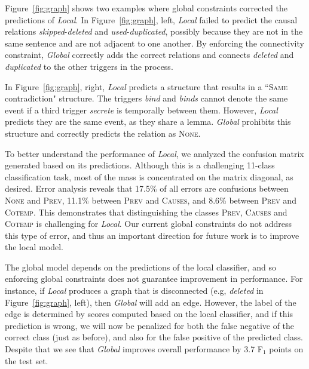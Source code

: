 Figure~\ref{fig:graph} shows two examples where global constraints corrected the predictions of \emph{Local}. In Figure~\ref{fig:graph}, left, \emph{Local} failed to predict the causal relations \emph{skipped}-\emph{deleted} and \emph{used}-\emph{duplicated}, possibly because they are not in the same sentence and are not adjacent to one another. By enforcing the connectivity constraint, \emph{Global} correctly adds the correct relations and connects \emph{deleted} and \emph{duplicated} to the other triggers in the process.

In Figure~\ref{fig:graph}, right, \emph{Local} predicts a structure that results in a ``\textsc{Same} contradiction" structure. The triggers \emph{bind} and \emph{binds} cannot denote the same event if a third trigger \emph{secrete} is temporally between them. However, \emph{Local} predicts they are the same event, as they share a lemma. \emph{Global} prohibits this structure and correctly predicts the relation as \textsc{None}.

To better understand the performance of \emph{Local}, we analyzed the confusion matrix generated based on its predictions. Although this is a challenging 11-class classification task, most of the mass is concentrated on the matrix diagonal, as desired. Error analysis reveals that 17.5\% of all errors are confusions between \textsc{None} and \textsc{Prev}, 11.1\% between \textsc{Prev} and \textsc{Causes}, and 8.6\% between \textsc{Prev} and \textsc{Cotemp}. This demonstrates that distinguishing the classes \textsc{Prev}, \textsc{Causes} and \textsc{Cotemp} is challenging for \emph{Local}. Our current global constraints do not address this type of error, and thus an important direction for future work is to improve the local model. 

The global model depends on the predictions of the local classifier, and so enforcing global constraints does not guarantee improvement in performance. For instance, if \emph{Local} produces a graph that is disconnected (e.g, \emph{deleted} in Figure~\ref{fig:graph}, left), then \emph{Global} will add an edge. However, the label of the edge is determined by scores computed based on the local classifier, and if this prediction is wrong, we will now be penalized for both the false negative of the correct class (just as before), and also for the false positive of the predicted class.  Despite that we see that \emph{Global} improves overall performance by 3.7 F$_{1}$ points on the test set.
